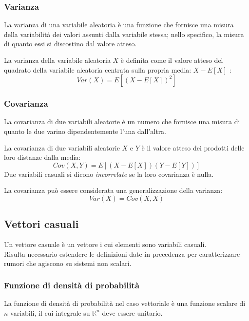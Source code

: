 \subsubsection{Varianza}

La varianza di una variabile aleatoria è una funzione che fornisce una misura della variabilità dei valori assunti dalla variabile stessa; nello specifico, la misura di quanto essi si discostino dal valore atteso.

La varianza della variabile aleatoria $X$ è definita come il valore atteso del quadrato della variabile aleatoria centrata sulla propria media: $X - E[X]$ :
\begin{equation}
Var(X) = E[(X - E[X])^2]
\end{equation}

\subsubsection{Covarianza}

La covarianza di due variabili aleatorie è un numero che fornisce una misura di quanto le due varino dipendentemente l'una dall'altra.

La covarianza di due variabili aleatorie $X$ e $Y$ è il valore atteso dei prodotti delle loro distanze dalla media: \begin{equation}
Cov(X,Y)= E [(X-E[X])(Y-E[Y])]
\end{equation}
Due variabili casuali si dicono \textit{incorrelate} se la loro covarianza è nulla.

La covarianza può essere considerata una generalizzazione della varianza:
\begin{equation}
Var(X) = Cov(X,X)
\end{equation}

\subsection{Vettori casuali}
Un vettore casuale è un vettore i cui elementi sono variabili casuali.\\
Risulta necessario estendere le definizioni date in precedenza per caratterizzare rumori che agiscono su sistemi non scalari.

\subsubsection{Funzione di densità di probabilità}
La funzione di densità di probabilità nel caso vettoriale è una funzione scalare di $n$ variabili, il cui integrale su $\mathbb{R}^n$ deve essere unitario.

